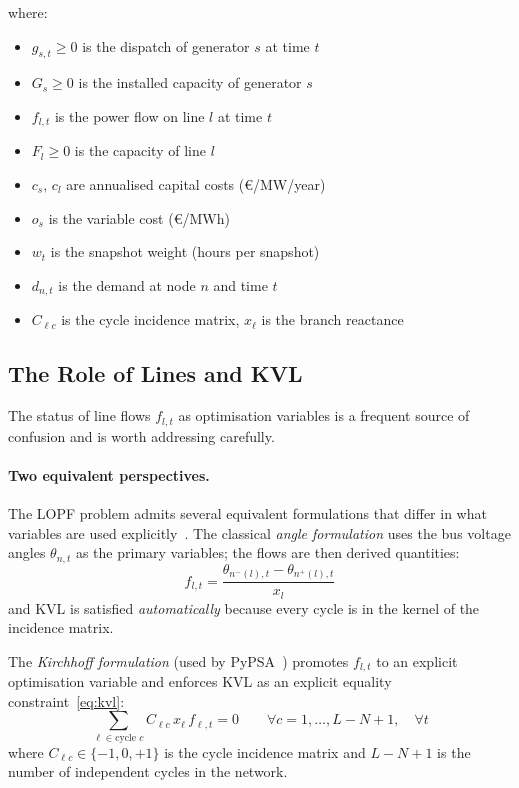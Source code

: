 \documentclass{article}
\begin{document}
where:
\begin{itemize}
    \item $g_{s,t} \ge 0$ is the dispatch of generator $s$ at time $t$
    \item $G_s \ge 0$ is the installed capacity of generator $s$
    \item $f_{l,t}$ is the power flow on line $l$ at time $t$
    \item $F_l \ge 0$ is the capacity of line $l$
    \item $c_s,\, c_l$ are annualised capital costs (\euro/MW/year)
    \item $o_s$ is the variable cost (\euro/MWh)
    \item $w_t$ is the snapshot weight (hours per snapshot)
    \item $d_{n,t}$ is the demand at node $n$ and time $t$
    \item $C_{\ell c}$ is the cycle incidence matrix, $x_\ell$ is the branch reactance
\end{itemize}

\subsection{The Role of Lines and KVL}
\label{sec:lines_kvl}

The status of line flows $f_{l,t}$ as optimisation variables is a frequent
source of confusion and is worth addressing carefully.

\paragraph{Two equivalent perspectives.}
The LOPF problem admits several equivalent formulations that differ in what
variables are used explicitly~\cite{Horsch2018}.
The classical \emph{angle formulation} uses the bus voltage angles $\theta_{n,t}$
as the primary variables; the flows are then derived quantities:
\begin{equation}
    f_{l,t} = \frac{\theta_{n^-(l),t} - \theta_{n^+(l),t}}{x_l}
    \label{eq:angle_flow}
\end{equation}
and KVL is satisfied \emph{automatically} because every cycle is in the kernel
of the incidence matrix.

The \emph{Kirchhoff formulation} (used by PyPSA~\cite{Horsch2018}) promotes
$f_{l,t}$ to an explicit optimisation variable and enforces KVL as an explicit
equality constraint~\eqref{eq:kvl}:
\begin{equation}
    \sum_{\ell \in \text{cycle } c} C_{\ell c}\, x_\ell\, f_{\ell,t} = 0
    \qquad \forall c = 1,\ldots,L-N+1,\quad \forall t
    \label{eq:kvl_explicit}
\end{equation}
where $C_{\ell c} \in \{-1,0,+1\}$ is the cycle incidence matrix and
$L - N + 1$ is the number of independent cycles in the network.
\end{document}
